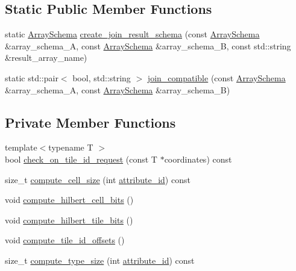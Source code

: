 \subsection*{Static Public Member Functions}
\begin{DoxyCompactItemize}
\item 
static \hyperlink{classArraySchema}{Array\+Schema} \hyperlink{classArraySchema_a043a7a6b37d93748b8acd90f4eebb579}{create\+\_\+join\+\_\+result\+\_\+schema} (const \hyperlink{classArraySchema}{Array\+Schema} \&array\+\_\+schema\+\_\+\+A, const \hyperlink{classArraySchema}{Array\+Schema} \&array\+\_\+schema\+\_\+\+B, const std\+::string \&result\+\_\+array\+\_\+name)
\item 
static std\+::pair$<$ bool, std\+::string $>$ \hyperlink{classArraySchema_a07cd6246c8275fbaa0e11adad15dd63a}{join\+\_\+compatible} (const \hyperlink{classArraySchema}{Array\+Schema} \&array\+\_\+schema\+\_\+\+A, const \hyperlink{classArraySchema}{Array\+Schema} \&array\+\_\+schema\+\_\+\+B)
\end{DoxyCompactItemize}
\subsection*{Private Member Functions}
\begin{DoxyCompactItemize}
\item 
{\footnotesize template$<$typename T $>$ }\\bool \hyperlink{classArraySchema_aac7f21da8dbe656b5a66d7d3e6a060de}{check\+\_\+on\+\_\+tile\+\_\+id\+\_\+request} (const T $\ast$coordinates) const 
\item 
size\+\_\+t \hyperlink{classArraySchema_a6ebd4c90c34ef99f3b180ba46c488007}{compute\+\_\+cell\+\_\+size} (int \hyperlink{classArraySchema_ad4c1390866e3dc27b6487b703aadddb1}{attribute\+\_\+id}) const 
\item 
void \hyperlink{classArraySchema_ac93b1943fa886b2f23a044923270ac1f}{compute\+\_\+hilbert\+\_\+cell\+\_\+bits} ()
\item 
void \hyperlink{classArraySchema_a48b7dae93b2ea596dadc371f14c6e265}{compute\+\_\+hilbert\+\_\+tile\+\_\+bits} ()
\item 
void \hyperlink{classArraySchema_ae7eb4efc11cd1ad902eb9cf9c5409ead}{compute\+\_\+tile\+\_\+id\+\_\+offsets} ()
\item 
size\+\_\+t \hyperlink{classArraySchema_a259005a67d3f5834c29948c644d45344}{compute\+\_\+type\+\_\+size} (int \hyperlink{classArraySchema_ad4c1390866e3dc27b6487b703aadddb1}{attribute\+\_\+id}) const 
\end{DoxyCompactItemize}
